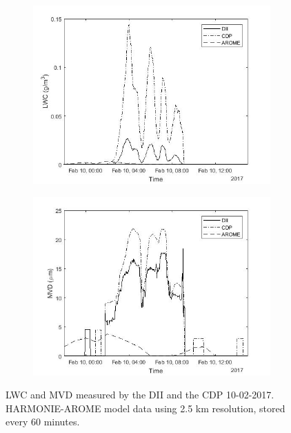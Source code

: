 \begin{figure}[ht]
\centering
\begin{subfigure}[t]{.8\textwidth}
  \centering
  \includegraphics[width=1\linewidth]{figures/170210/30min_lwc_CDP_DII_SMHI_170210_2263part}
  \label{fig:170210_LWCvstime}
\end{subfigure}%

\begin{subfigure}[t]{.8\textwidth}
  \centering
  \includegraphics[width=1\linewidth]{figures/170210/30min_mvd_CDP_DII_SMHI_170210_2263part}
  \label{fig:170210_MVDvstime}
\end{subfigure}
\caption{LWC and MVD measured by the DII and the CDP 10-02-2017. HARMONIE-AROME model data using 2.5 km resolution, stored every 60 minutes.}
\label{fig:170210_lwc_mvd}
\end{figure}

